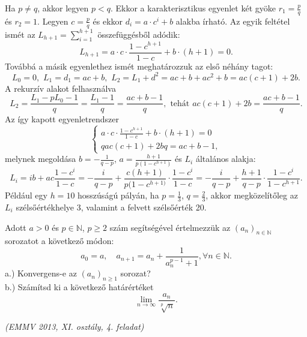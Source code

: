 \begin{solution}
Ha $p\neq q$, akkor legyen $p<q$. Ekkor a karakterisztikus egyenlet
két gyöke $r_{1}=\frac{p}{q}$ és $r_{2}=1$. Legyen $c=\frac{p}{q}$
és ekkor $d_{i}=a\cdot c^{i}+b$ alakba írható. Az egyik feltétel
ismét az $L_{h+1}=\sum\limits_{i=1}^{h+1}$ összefüggésből adódik:
\[
L_{h+1}=a\cdot c\cdot\frac{1-c^{h+1}}{1-c}+b\cdot(h+1)=0.
\]
Továbbá a másik egyenlethez ismét meghatározzuk az első néhány tagot:
\[
L_{0}=0,\phantom{i}L_{1}=d_{1}=ac+b,\phantom{i}L_{2}=L_{1}+d^{2}=ac+b+ac^{2}+b=ac(c+1)+2b.
\]
A rekurzív alakot felhasználva 
\[
L_{2}=\frac{L_{1}-pL_{0}-1}{q}=\frac{L_{1}-1}{q}=\frac{ac+b-1}{q},\phantom{i}\textrm{tehát}\phantom{i}ac(c+1)+2b=\frac{ac+b-1}{q}.
\]
Az így kapott egyenletrendszer 
\[
\left\{ \begin{array}{l}
a\cdot c\cdot\frac{1-c^{h+1}}{1-c}+b\cdot(h+1)=0\\
qac(c+1)+2bq=ac+b-1,
\end{array}\right.
\]
melynek megoldása $b=-\frac{1}{q-p}$, $a=\frac{h+1}{p(1-c^{h+1})}$
és $L_{i}$ általános alakja: 
\[
L_{i}=ib+ac\frac{1-c^{i}}{1-c}=-\frac{i}{q-p}+\frac{c(h+1)}{p(1-c^{h+1)}}\cdot\frac{1-c^{i}}{1-c}=-\frac{i}{q-p}+\frac{h+1}{q-p}\cdot\frac{1-c^{i}}{1-c^{h+1}}.
\]
Például egy $h=10$ hosszúságú pályán, ha $p=\frac{1}{3}$, $q=\frac{2}{3}$,
akkor megközelítőleg az $L_{i}$ szélsőértékhelye 3, valamint a felvett
szélsőérték 20.
\end{solution}
\begin{extraproblem}
Adott $a>0$ és $p\in\mathbb{N}$, $p\geq2$ szám segítségével értelmezzük
az $(a_{n})_{n\in\mathbb{N}}$ sorozatot a következő módon: 
\[
a_{0}=a,\quad a_{n+1}=a_{n}+\frac{1}{a_{n}^{p-1}+1},\forall n\in\mathbb{N}.
\]
a.) Konvergens-e az $(a_{n})_{n\geq1}$ sorozat?\\
 b.) Számítsd ki a következő határértéket 
\[
\lim\limits_{n\to\infty}\frac{a_{n}}{\sqrt[p]{n}}.
\]
\begin{flushright}
\textit{(EMMV 2013, XI. osztály, 4. feladat)} 
\par\end{flushright}
\end{extraproblem}

